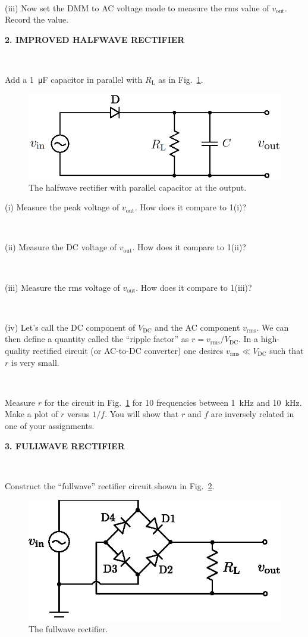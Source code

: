 \documentclass[12pt,oneside,openany,letterpaper]{article}
\begin{document}
~

\noindent (iii) Now set the DMM to AC voltage mode to measure the rms value of $v_\mathrm{out}$.  Record the value.

\clearpage

{\bf 2. IMPROVED HALFWAVE RECTIFIER}

~

\noindent Add a \SI{1}{\micro\farad} capacitor in parallel with $R_\mathrm{L}$ as in Fig.~\ref{fig:halfwaveC}.
\begin{figure}[h!]
\begin{center}
\includegraphics[width=.53\textwidth]{halfWaveC.eps}
\caption{\label{fig:halfwaveC}The halfwave rectifier with parallel capacitor at the output.}
\end{center}
\end{figure}

\noindent (i) Measure the peak voltage of $v_\mathrm{out}$.  How does it compare to 1(i)?

~

\noindent (ii) Measure the DC voltage of $v_\mathrm{out}$.  How does it compare to 1(ii)?

~

\noindent (iii) Measure the rms voltage of $v_\mathrm{out}$.  How does it compare to 1(iii)?

~

\noindent (iv) Let's call the DC component of $V_\mathrm{DC}$ and the AC component $v_\mathrm{rms}$.  We can then define a quantity called the ``ripple factor'' as $r=v_\mathrm{rms}/V_\mathrm{DC}$.  In a high-quality rectified circuit (or AC-to-DC converter) one desires $v_\mathrm{rms}\ll V_\mathrm{DC}$ such that $r$ is very small.

~

\noindent Measure $r$ for the circuit in Fig.~\ref{fig:halfwaveC} for 10 frequencies between \SI{1}{\kilo\hertz} and \SI{10}{\kilo\hertz}.  Make a plot of $r$ versus $1/f$.  You will show that $r$ and $f$ are inversely related in one of your assignments.

\clearpage

{\bf 3. FULLWAVE RECTIFIER}

~

\noindent Construct the ``fullwave'' rectifier circuit shown in Fig.~\ref{fig:fullwave}.
\begin{figure}[h!]
\begin{center}
\includegraphics[width=.51\textwidth]{fullWave.eps}
\caption{\label{fig:fullwave}The fullwave rectifier.}
\end{center}
\end{figure}
\end{document}
